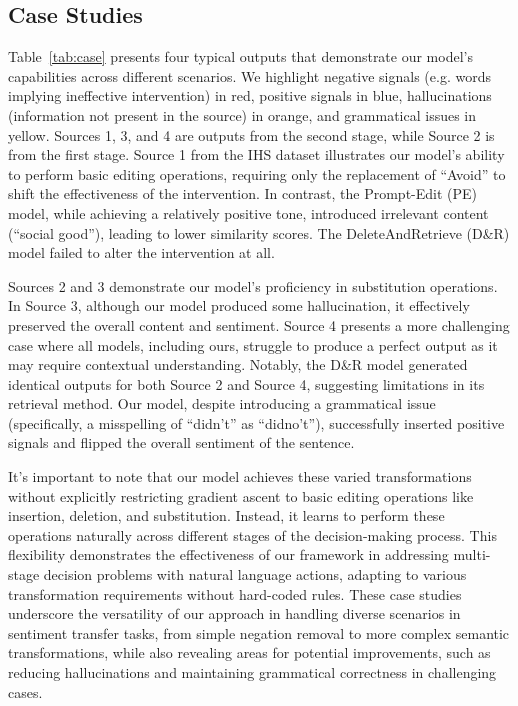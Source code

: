 \documentclass{article}
\begin{document}
\subsection{Case Studies}

Table~\ref{tab:case} presents four typical outputs that demonstrate our model's capabilities across different scenarios. We highlight negative signals (e.g. words implying ineffective intervention) in red, positive signals in blue, hallucinations (information not present in the source) in orange, and grammatical issues in yellow. Sources 1, 3, and 4 are outputs from the second stage, while Source 2 is from the first stage. Source 1 from the IHS dataset illustrates our model's ability to perform basic editing operations, requiring only the replacement of ``Avoid'' to shift the effectiveness of the intervention. In contrast, the Prompt-Edit (PE) model, while achieving a relatively positive tone, introduced irrelevant content (``social good''), leading to lower similarity scores. The DeleteAndRetrieve (D\&R) model failed to alter the intervention at all.

Sources 2 and 3 demonstrate our model's proficiency in substitution operations. In Source 3, although our model produced some hallucination, it effectively preserved the overall content and sentiment. Source 4 presents a more challenging case where all models, including ours, struggle to produce a perfect output as it may require contextual understanding. Notably, the D\&R model generated identical outputs for both Source 2 and Source 4, suggesting limitations in its retrieval method. Our model, despite introducing a grammatical issue (specifically, a misspelling of ``didn't'' as ``didno't''), successfully inserted positive signals and flipped the overall sentiment of the sentence.

It's important to note that our model achieves these varied transformations without explicitly restricting gradient ascent to basic editing operations like insertion, deletion, and substitution. Instead, it learns to perform these operations naturally across different stages of the decision-making process. This flexibility demonstrates the effectiveness of our framework in addressing multi-stage decision problems with natural language actions, adapting to various transformation requirements without hard-coded rules. These case studies underscore the versatility of our approach in handling diverse scenarios in sentiment transfer tasks, from simple negation removal to more complex semantic transformations, while also revealing areas for potential improvements, such as reducing hallucinations and maintaining grammatical correctness in challenging cases.
\end{document}
